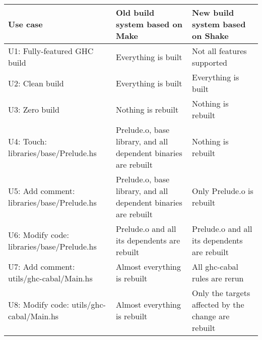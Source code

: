 \newcommand{\checkedbox}{\makebox[0pt][l]{$\square$}\raisebox{.15ex}{\hspace{0.1em}$\checkmark$}}
\newcommand{\uncheckedbox}{\makebox[0pt][l]{$\square$}\raisebox{.15ex}{\hspace{0.92em}}}
\begin{table*}[t]
\centering
\begin{tabular}{p{60mm} || p{50mm} | p{50mm}}
\textbf{Use case}
& \textbf{Old build system} based on Make
& \textbf{New build system} based on Shake
\\
\hline
\textsf{U1:} Fully-featured GHC build
& Everything is built \hfill \checkedbox
& Not all features supported \hfill \uncheckedbox
\\
\textsf{U2:} Clean build
& Everything is built \hfill \checkedbox
& Everything is built \hfill \checkedbox
\\
\textsf{U3:} Zero build \hspace{6.4mm}
& Nothing is rebuilt \hfill \checkedbox
& Nothing is rebuilt \hfill \checkedbox
\\
\hline
\textsf{U4:} Touch: \hspace{10.2mm}\textsf{libraries/base/Prelude.hs}
& \textsf{Prelude.o}, \textsf{base} library, and all \hfill \uncheckedbox
\newline dependent binaries are rebuilt
& Nothing is rebuilt \hfill \checkedbox
\\
\textsf{U5:} Add comment: \textsf{libraries/base/Prelude.hs}
& \textsf{Prelude.o}, \textsf{base} library, and all \hfill \uncheckedbox
\newline dependent binaries are rebuilt
& Only \textsf{Prelude.o} is rebuilt \hfill \checkedbox
\\
\textsf{U6:} Modify code: \hspace{1.75mm}\textsf{libraries/base/Prelude.hs}
& \textsf{Prelude.o} and all its dependents \hfill \checkedbox \newline
are rebuilt
& \textsf{Prelude.o} and all its dependents \hfill \checkedbox \newline
are rebuilt
\\
\textsf{U7:} Add comment: \textsf{utils/ghc-cabal/Main.hs}
& Almost everything is rebuilt \hfill \uncheckedbox
& All \textsf{ghc-cabal} rules are rerun \hfill \uncheckedbox
\\
\textsf{U8:} Modify code: \hspace{1.75mm}\textsf{utils/ghc-cabal/Main.hs}
& Almost everything is rebuilt \hfill \uncheckedbox
& Only the targets affected by the \hfill \checkedbox \newline change are rebuilt

\end{tabular}
\end{table*}
